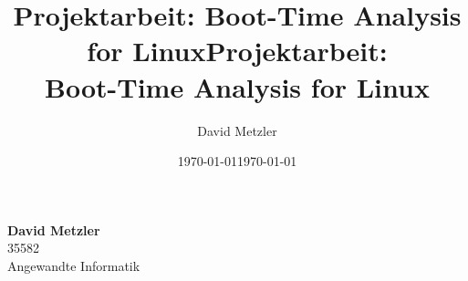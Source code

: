 \documentclass[12pt, a4paper]{scrartcl}
\author{David Metzler}
\title{Projektarbeit: Boot-Time Analysis for Linux}
\date{\today}
\begin{document}
\title{\Huge Projektarbeit: \\ Boot-Time Analysis for Linux}
\date{\today}
\maketitle
\vspace{4cm}
\begin{minipage}{1.1\textwidth}
	\flushright
	\textbf{David Metzler}\\
	35582 \\
	Angewandte Informatik
\end{minipage}
\newpage

\tableofcontents
\newpage












\printbibliography
\end{document}
